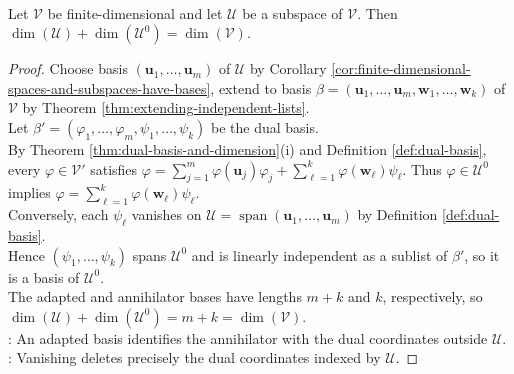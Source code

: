 \begin{theorem} \label{thm:dimension-of-annihilator} \\
Let $\mathcal{V}$ be finite-dimensional and let $\mathcal{U}$ be a subspace of $\mathcal{V}$. Then $\dim(\mathcal{U})+\dim(\mathcal{U}^0)=\dim(\mathcal{V})$.
\begin{proof}
Choose basis $(\mathbf{u}_1,\ldots,\mathbf{u}_m)$ of $\mathcal{U}$ by Corollary \ref{cor:finite-dimensional-spaces-and-subspaces-have-bases}, extend to basis $\beta=(\mathbf{u}_1,\ldots,\mathbf{u}_m,\mathbf{w}_1,\ldots,\mathbf{w}_k)$ of $\mathcal{V}$ by Theorem \ref{thm:extending-independent-lists}.\\
Let $\beta'=(\varphi_1,\ldots,\varphi_m,\psi_1,\ldots,\psi_k)$ be the dual basis.\\
By Theorem \ref{thm:dual-basis-and-dimension}(i) and Definition \ref{def:dual-basis}, every $\varphi\in\mathcal{V}'$ satisfies $\varphi=\sum\limits_{j=1}^{m}\varphi(\mathbf{u}_j)\varphi_j+\sum\limits_{\ell=1}^{k}\varphi(\mathbf{w}_\ell)\psi_\ell$. Thus $\varphi\in\mathcal{U}^0$ implies $\varphi=\sum\limits_{\ell=1}^{k}\varphi(\mathbf{w}_\ell)\psi_\ell$.\\
Conversely, each $\psi_\ell$ vanishes on $\mathcal{U}=\operatorname{span}(\mathbf{u}_1,\ldots,\mathbf{u}_m)$ by Definition \ref{def:dual-basis}.\\
Hence $(\psi_1,\ldots,\psi_k)$ spans $\mathcal{U}^0$ and is linearly independent as a sublist of $\beta'$, so it is a basis of $\mathcal{U}^0$.\\
The adapted and annihilator bases have lengths $m+k$ and $k$, respectively, so $\dim(\mathcal{U})+\dim(\mathcal{U}^0)=m+k=\dim(\mathcal{V})$.\\
: An adapted basis identifies the annihilator with the dual coordinates outside $\mathcal{U}$.\\
: Vanishing deletes precisely the dual coordinates indexed by $\mathcal{U}$.
\end{proof}
\end{theorem}

